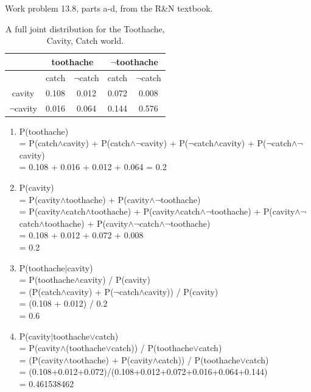 \documentclass[paper=a4, fontsize=11pt]{scrartcl} %
\begin{document}
\section{}

\begin{fancyquotes}
  Work problem 13.8, parts a-d, from the R\&N textbook.
\end{fancyquotes}
\begin{table}[hp]
  \centering
  \begin{tabular}{ccccc}
    \toprule
    & \multicolumn{2}{c}{toothache} &
    \multicolumn{2}{c}{$\lnot$toothache}\\
    \midrule
    & catch & $\lnot$catch & catch & $\lnot$catch\\
    cavity & 0.108 & 0.012 & 0.072 & 0.008\\
    $\lnot$cavity & 0.016 & 0.064 & 0.144 & 0.576\\
    \bottomrule
  \end{tabular}
  \caption{A full joint distribution for the Toothache, Cavity, Catch world.}
\end{table}

\begin{enumerate}
\item P(toothache)\\
  = P(catch$\land$cavity) + P(catch$\land$$\lnot$cavity)
  + P($\lnot$catch$\land$cavity) + P($\lnot$catch$\land$$\lnot$cavity)\\
  = 0.108 + 0.016 + 0.012 + 0.064 = 0.2\\
\item P(cavity)\\
  = P(cavity$\land$toothache) + P(cavity$\land$$\lnot$toothache)\\
  = P(cavity$\land$catch$\land$toothache) +
  P(cavity$\land$catch$\land$$\lnot$toothache) +
  P(cavity$\land$$\lnot$catch$\land$toothache) +
  P(cavity$\land$$\lnot$catch$\land$$\lnot$toothache)\\
  = 0.108 + 0.012 + 0.072 + 0.008\\
  = 0.2
\item P(toothache$|$cavity)\\
  = P(toothache$\land$cavity) / P(cavity)\\
  = (P(catch$\land$cavity) + P($\lnot$catch$\land$cavity)) /
  P(cavity)\\
  = (0.108 + 0.012) / 0.2\\
  = 0.6
\item P(cavity$|$toothache$\lor$catch)\\
  = P(cavity$\land$(toothache$\lor$catch)) / P(toothache$\lor$catch)\\
  = (P(cavity$\land$toothache) + P(cavity$\land$catch)) /
  P(toothache$\lor$catch)\\
  = (0.108+0.012+0.072)/(0.108+0.012+0.072+0.016+0.064+0.144)\\
  = 0.461538462
\end{enumerate}
\end{document}
